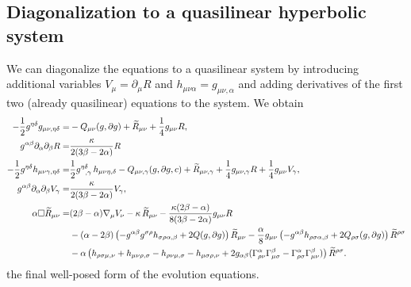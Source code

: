 \documentclass[a4paper,oneside,openany,11pt]{memoir}
\numberwithin{equation}{section} %
\begin{document}
\subsection{Diagonalization to a quasilinear hyperbolic system}
We can diagonalize the equations to a quasilinear system by introducing additional variables $V_\mu = \partial_\mu R$ and $h_{\mu\nu\alpha} = g_{\mu\nu,\alpha}$ and adding derivatives of the first two (already quasilinear) equations to the system. We obtain
\begin{align}
\label{eq:MoralesForm}
	-\frac{1}{2}g^{\eta\delta}g_{\mu\nu,\eta\delta}=
	&-Q_{\mu\nu}(g,\partial g)+\widetilde{R}_{\mu\nu} + \frac{1}{4}g_{\mu\nu}R,
	\\
	g^{\alpha\beta}\partial_{\alpha}\partial_{\beta}R=
	&\frac{\kappa}{2(3\beta-2\alpha)}R
	\\
	-\frac{1}{2}g^{\eta\delta}h_{\mu\nu\gamma,\eta\delta}=
	&\frac{1}{2}g^{\eta\delta}_{\,\,\,\,,\gamma}\,h_{\mu\nu\eta,\delta}-Q_{\mu\nu,\gamma}(g,\partial g, c)+\widetilde{R}_{\mu\nu,\gamma}
	+\frac{1}{4}g_{\mu\nu,\gamma}R+\frac{1}{4}g_{\mu\nu}V_\gamma,
	\\
	g^{\alpha\beta}\partial_{\alpha}\partial_{\beta}V_\gamma=
	&\frac{\kappa}{2(3\beta-2\alpha)}V_\gamma,
	\\
	\alpha \square \widetilde R_{\mu\nu}=
	&(2\beta-\alpha) \nabla_{\mu}V_\nu
	-\kappa\,\widetilde{R}_{\mu\nu}
	-\frac{\kappa(2\beta-\alpha)}{8(3\beta-2\alpha)}g_{\mu\nu}R 
	\\\notag
	&-(\alpha-2\beta)\left(-g^{\alpha\beta}g^{\sigma\rho}h_{\sigma\rho\alpha,\beta}+2Q(g,\partial g)\right)\widetilde{R}_{\mu\nu}
	-\frac{\alpha}{8} g_{\mu\nu}\left(-g^{\alpha\beta}h_{\rho\sigma\alpha,\beta}+2Q_{\rho\sigma}(g,\partial g)\right)\widetilde{R}^{\rho\sigma}
	\\\notag
	&-\alpha \left(h_{\rho\sigma\mu,\nu} +h_{\mu\nu\rho,\sigma}-h_{\rho\nu\mu,\sigma} -h_{\mu\sigma\rho,\nu}+2g_{\alpha\beta}(\Gamma^{\alpha}_{\rho\nu}\Gamma^{\beta}_{\mu\sigma}-\Gamma_{\rho\sigma}^{\alpha}\Gamma_{\mu\nu}^{\beta})\right)\widetilde{R}^{\rho\sigma}.
\end{align}
the final well-posed form of the evolution equations.
\end{document}
